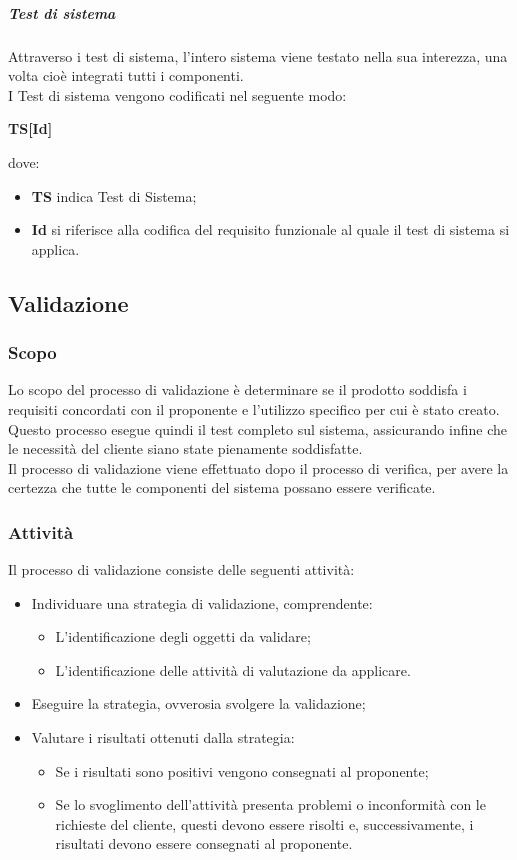 \documentclass[../norme-di-progetto.tex]{subfiles}
\begin{document}
\subparagraph*{Test di sistema}
Attraverso i test di sistema, l'intero sistema viene testato nella sua interezza, una volta cioè integrati tutti i componenti. \\
I Test di sistema vengono codificati nel seguente modo:
\begin{center}
  \centering
  \textbf{TS[Id]}
\end{center} dove:
\begin{itemize}
  \item \textbf{TS} indica Test di Sistema;
  \item \textbf{Id} si riferisce alla codifica del requisito funzionale al quale il test di sistema si applica.
\end{itemize}

\subsection{Validazione}
\subsubsection{Scopo}
Lo scopo del processo di validazione è determinare se il prodotto soddisfa i requisiti concordati con il proponente e l'utilizzo specifico per cui è stato creato. Questo processo esegue quindi il test completo sul sistema, assicurando infine che le necessità del cliente siano state pienamente soddisfatte. \\ Il processo di validazione viene effettuato dopo il processo di verifica, per avere la certezza che tutte le componenti del sistema possano essere verificate.
\subsubsection{Attività}
Il processo di validazione consiste delle seguenti attività:
\begin{itemize}
  \item Individuare una strategia di validazione, comprendente:
  \begin{itemize}
    \item L'identificazione degli oggetti da validare;
    \item L'identificazione delle attività di valutazione da applicare.
  \end{itemize}
  \item Eseguire la strategia, ovverosia svolgere la validazione;
  \item Valutare i risultati ottenuti dalla strategia:
  \begin{itemize}
    \item Se i risultati sono positivi vengono consegnati al proponente;
    \item Se lo svoglimento dell'attività presenta problemi o inconformità con le richieste del cliente, questi devono essere risolti e, successivamente, i risultati devono essere consegnati al proponente.
  \end{itemize}
\end{itemize}
\end{document}
